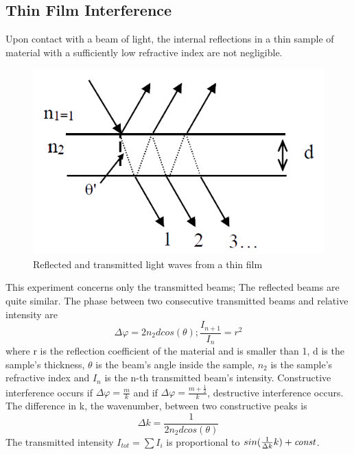 \documentclass[reprint,amsmath,amssymb,aps, prl]{revtex4-2}
\begin{document}
\subsection{Thin Film Interference}
Upon contact with a beam of light, the internal reflections in a thin sample of material with a sufficiently low refractive index are not negligible.
\begin{figure}[h]
    \includegraphics[width=\linewidth]{Images/Thin film.png}
    \caption{Reflected and transmitted light waves from a thin film}
    \label{fig:ThinFilm}
\end{figure}

This experiment concerns only the transmitted beams; The reflected beams are quite similar. The phase between two consecutive transmitted beams and relative intensity are
\begin{equation} \label{eq:ThinPhaseAmp}
\Delta\varphi=2n_{2}dcos(\theta);\frac{I_{n+1}}{I_{n}}=r^{2}
\end{equation}
where r is the reflection coefficient of the material and is smaller than 1, d is the sample's thickness, $\theta$ is the beam's angle inside the sample, $n_{2}$ is the sample's refractive index and $I_{n}$ is the n-th transmitted beam's intensity. Constructive interference occurs if $\Delta\varphi=\frac{m}{k}$ and if $\Delta\varphi=\frac{m+\frac{1}{2}}{k}$, destructive interference occurs. The difference in k, the wavenumber, between two constructive peaks is 
\begin{equation} \label{eq:ThinDiffWavenum}
\Delta k=\frac{1}{2n_{2}dcos(\theta)}
\end{equation} 
The transmitted intensity $I_{tot}=\sum I_{i}$ is proportional to $sin(\frac{1}{\Delta k}k)+{\it const}$.
\end{document}
